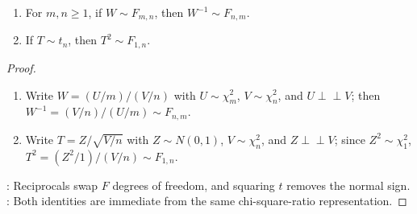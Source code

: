 \begin{corollary} \label{cor:f-reciprocal-and-squared-t} 
\begin{enumerate}[label=(\roman*)]
\setlength{\itemsep}{0pt}
\item
For $m,n\geq1$, if $W\sim F_{m,n}$, then $W^{-1}\sim F_{n,m}$.
\item
If $T\sim t_n$, then $T^2\sim F_{1,n}$.
\end{enumerate}
\begin{proof}
\begin{enumerate}[label=(\roman*)]
\setlength{\itemsep}{0pt}
\item
Write $W=(U/m)/(V/n)$ with $U\sim\chi_m^2$, $V\sim\chi_n^2$, and $U\perp\!\!\!\perp V$; then $W^{-1}=(V/n)/(U/m)\sim F_{n,m}$.
\item
Write $T=Z/\sqrt{V/n}$ with $Z\sim N(0,1)$, $V\sim\chi_n^2$, and $Z\perp\!\!\!\perp V$; since $Z^2\sim\chi_1^2$, $T^2=(Z^2/1)/(V/n)\sim F_{1,n}$.
\end{enumerate}
: Reciprocals swap $F$ degrees of freedom, and squaring $t$ removes the normal sign.\\
: Both identities are immediate from the same chi-square-ratio representation.
\end{proof}
\end{corollary}
